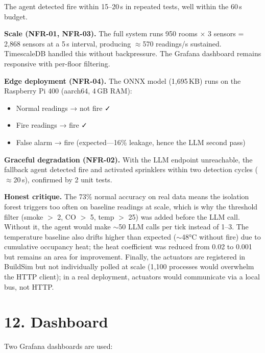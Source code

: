 \documentclass[11pt]{article}
\providecommand{\tightlist}{\setlength{\itemsep}{0pt}\setlength{\parskip}{0pt}}
\begin{document}
The agent detected fire within 15--20\,s in repeated tests, well within the 60\,s budget.

\textbf{Scale (NFR-01, NFR-03).} The full system runs 950 rooms $\times$ 3 sensors = 2,868 sensors at a 5\,s interval, producing $\approx$570 readings/s sustained. TimescaleDB handled this without backpressure. The Grafana dashboard remains responsive with per-floor filtering.

\textbf{Edge deployment (NFR-04).} The ONNX model (1,695\,KB) runs on the Raspberry Pi 400 (aarch64, 4\,GB RAM):
\begin{itemize}\tightlist
  \item Normal readings → not fire ✓
  \item Fire readings → fire ✓
  \item False alarm → fire (expected---16\% leakage, hence the LLM second pass)
\end{itemize}

\textbf{Graceful degradation (NFR-02).} With the LLM endpoint unreachable, the fallback agent detected fire and activated sprinklers within two detection cycles ($\approx$20\,s), confirmed by 2 unit tests.

\textbf{Honest critique.} The 73\% normal accuracy on real data means the isolation forest triggers too often on baseline readings at scale, which is why the threshold filter (smoke $>$ 2, CO $>$ 5, temp $>$ 25) was added before the LLM call. Without it, the agent would make $\sim$50 LLM calls per tick instead of 1--3. The temperature baseline also drifts higher than expected ($\sim$48°C without fire) due to cumulative occupancy heat; the heat coefficient was reduced from 0.02 to 0.001 but remains an area for improvement. Finally, the actuators are registered in BuildSim but not individually polled at scale (1,100 processes would overwhelm the HTTP client); in a real deployment, actuators would communicate via a local bus, not HTTP.


\section{12. Dashboard}

Two Grafana dashboards are used:
\end{document}
